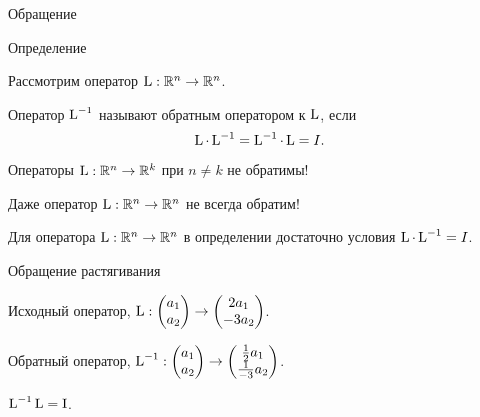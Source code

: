 

\begin{frame} %


\end{frame}
  

\begin{frame}{Обращение}




\begin{block}{Определение}

Рассмотрим оператор $\operatorname{L} : \mathbb{R}^n \to \mathbb{R}^n$. 

Оператор $\operatorname{L}^{-1}$ называют \alert{обратным оператором} к $\operatorname{L}$, если 
\[
\operatorname{L} \cdot \operatorname{L}^{-1} = \operatorname{L}^{-1} \cdot  \operatorname{L} = I.
\]
\end{block}

\pause

Операторы $\operatorname{L}: \mathbb{R}^n \to \mathbb{R}^k$ при $n \neq k$ не обратимы!

\pause

Даже оператор $\operatorname{L}: \mathbb{R}^n \to \mathbb{R}^n$ не всегда обратим!

\pause

Для оператора $\operatorname{L}: \mathbb{R}^n \to \mathbb{R}^n$ в определении достаточно условия $\operatorname{L} \cdot \operatorname{L}^{-1} = I$.


\end{frame}


\begin{frame}{Обращение растягивания}


Исходный оператор, $\operatorname{L} : \begin{pmatrix}
  a_1 \\
  a_2 \\
\end{pmatrix} \to
\begin{pmatrix}
  2a_1 \\
  -3a_2 \\
\end{pmatrix}
$.
\pause

Обратный оператор,  
$\operatorname{L}^{-1} : \begin{pmatrix}
    a_1 \\
    a_2 \\
  \end{pmatrix} \to
  \begin{pmatrix}
    \frac{1}{2}a_1 \\
    \frac{1}{-3}a_2 \\
  \end{pmatrix}
  $.

\pause
$\operatorname{L}^{-1} \operatorname{L} = \mathrm{I}$.


\end{frame}
    

